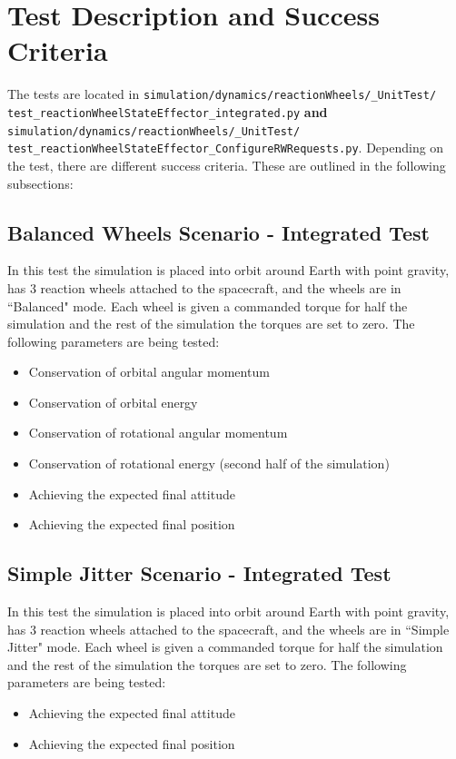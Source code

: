 \section{Test Description and Success Criteria}
The tests are located in \texttt{simulation/dynamics/reactionWheels/\_UnitTest/\newline
test\_reactionWheelStateEffector\_integrated.py} \textbf{and} \texttt{simulation/dynamics/reactionWheels/\newline\_UnitTest/
test\_reactionWheelStateEffector\_ConfigureRWRequests.py}. Depending on the test, there are different success criteria. These are outlined in the following subsections:
\subsection{Balanced Wheels Scenario - Integrated Test}
In this test the simulation is placed into orbit around Earth with point gravity, has 3 reaction wheels attached to the spacecraft, and the wheels are in ``Balanced" mode. Each wheel is given a commanded torque for half the simulation and the rest of the simulation the torques are set to zero. The following parameters are being tested:
\begin{itemize}
	\item Conservation of orbital angular momentum
	\item Conservation of orbital energy
	\item Conservation of rotational angular momentum
	\item Conservation of rotational energy (second half of the simulation)
	\item Achieving the expected final attitude
	\item Achieving the expected final position
\end{itemize}

\subsection{Simple Jitter Scenario - Integrated Test}
In this test the simulation is placed into orbit around Earth with point gravity, has 3 reaction wheels attached to the spacecraft, and the wheels are in ``Simple Jitter" mode. Each wheel is given a commanded torque for half the simulation and the rest of the simulation the torques are set to zero. The following parameters are being tested:
\begin{itemize}
\item Achieving the expected final attitude
\item Achieving the expected final position
\end{itemize}

